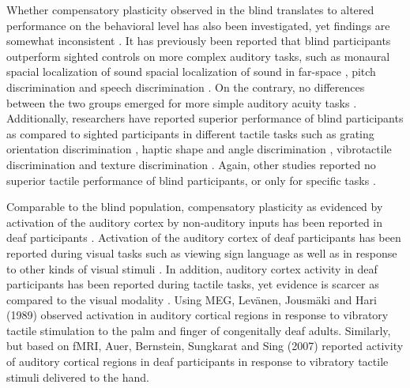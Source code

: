 \documentclass[12pt]{article}
\begin{document}
Whether compensatory plasticity observed in the blind translates to altered performance on the behavioral level has also been investigated, yet findings are somewhat inconsistent \parencite{merabet_neural_2010, theoret_behavioral_2004, voss_adaptation_2010}. It has previously been reported that blind participants outperform sighted controls on more complex auditory tasks, such as monaural spacial localization of sound \parencite{collignon_cross-modal_2008,gougoux_functional_2005,lessard_early-blind_1998} spacial localization of sound in far-space \parencite{voss_early-_2004}, pitch discrimination \parencite{gougoux_pitch_2004} and speech discrimination \parencite{niemeyer_blind_1981}. On the contrary, no differences between the two groups emerged for more simple auditory acuity tasks \parencite{bross_temporal_1982}. Additionally, researchers have reported superior performance of blind participants as compared to sighted participants in different tactile tasks such as grating orientation discrimination \parencite{boven_tactile_2000,goldreich_tactile_2003,wong_tactile_2011}, haptic shape and angle discrimination \parencite{alary_tactile_2008,norman_blindness_2011} , vibrotactile discrimination \parencite{wan_congenital_2010} and texture discrimination \parencite{alary_tactile_2009}. Again, other studies reported no superior tactile performance of blind participants, or only for specific tasks \parencite{alary_tactile_2009,grant_tactile_2000,papagno_deaf_2016}.
\par Comparable to the blind population, compensatory plasticity as evidenced by activation of the auditory cortex by non-auditory inputs has been reported in deaf participants \parencite[for reviews, see][]{heimler_revisiting_2014, merabet_neural_2010, voss_adaptation_2010}. Activation of the auditory cortex of deaf participants has been reported during visual tasks such as viewing sign language \parencite{nishimura_sign_1999,petitto_speech-like_2000} as well as in response to other kinds of visual stimuli \parencite{finney_visual_2003,karns_altered_2012,sadato_cross-modal_2005}. In addition, auditory cortex activity in deaf participants has been reported during tactile tasks, yet evidence is scarcer as compared to the visual modality \parencite{auer_vibrotactile_2007,levanen_vibration-induced_1998,merabet_neural_2010,schurmann_touch_2006}. Using MEG, Levänen, Jousmäki and Hari (1989) observed activation in auditory cortical regions in response to vibratory tactile stimulation to the palm and finger of congenitally deaf adults. Similarly, but based on fMRI,  Auer, Bernstein, Sungkarat and Sing (2007) reported activity of auditory cortical regions in deaf participants in response to vibratory tactile stimuli delivered to the hand. 
\end{document}
